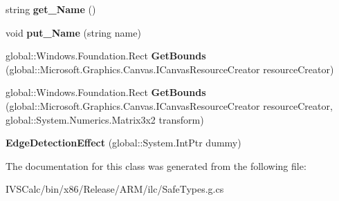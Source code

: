 \begin{DoxyCompactItemize}
\item 
\mbox{\label{class_microsoft_1_1_graphics_1_1_canvas_1_1_effects_1_1_edge_detection_effect_ac0bf82cf53e37350a24391325ce87879}} 
string {\bfseries get\+\_\+\+Name} ()
\item 
\mbox{\label{class_microsoft_1_1_graphics_1_1_canvas_1_1_effects_1_1_edge_detection_effect_a35dbf0d4e7354d2554ec71ad482ea7cc}} 
void {\bfseries put\+\_\+\+Name} (string name)
\item 
\mbox{\label{class_microsoft_1_1_graphics_1_1_canvas_1_1_effects_1_1_edge_detection_effect_a05dbef4b9e01ccf2927bea9316a0cc4c}} 
global\+::\+Windows.\+Foundation.\+Rect {\bfseries Get\+Bounds} (global\+::\+Microsoft.\+Graphics.\+Canvas.\+I\+Canvas\+Resource\+Creator resource\+Creator)
\item 
\mbox{\label{class_microsoft_1_1_graphics_1_1_canvas_1_1_effects_1_1_edge_detection_effect_a633113ef50a9947d0a1e0964566587d8}} 
global\+::\+Windows.\+Foundation.\+Rect {\bfseries Get\+Bounds} (global\+::\+Microsoft.\+Graphics.\+Canvas.\+I\+Canvas\+Resource\+Creator resource\+Creator, global\+::\+System.\+Numerics.\+Matrix3x2 transform)
\item 
\mbox{\label{class_microsoft_1_1_graphics_1_1_canvas_1_1_effects_1_1_edge_detection_effect_a9542f96d28e629e75fc7549550e42caf}} 
{\bfseries Edge\+Detection\+Effect} (global\+::\+System.\+Int\+Ptr dummy)
\end{DoxyCompactItemize}


The documentation for this class was generated from the following file\+:\begin{DoxyCompactItemize}
\item 
I\+V\+S\+Calc/bin/x86/\+Release/\+A\+R\+M/ilc/Safe\+Types.\+g.\+cs\end{DoxyCompactItemize}
